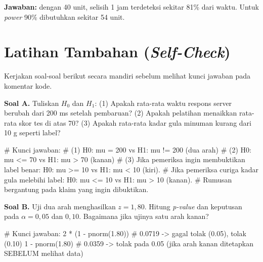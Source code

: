 \documentclass[
  indonesian,
  letterpaper,
]{book}
\newenvironment{Shaded}{\begin{snugshade}}{\end{snugshade}}
\newcommand{\CommentTok}[1]{\textcolor[rgb]{0.37,0.37,0.37}{#1}}
\newcommand{\DecValTok}[1]{\textcolor[rgb]{0.68,0.00,0.00}{#1}}
\newcommand{\FloatTok}[1]{\textcolor[rgb]{0.68,0.00,0.00}{#1}}
\newcommand{\FunctionTok}[1]{\textcolor[rgb]{0.28,0.35,0.67}{#1}}
\newcommand{\NormalTok}[1]{\textcolor[rgb]{0.00,0.23,0.31}{#1}}
\newcommand{\SpecialCharTok}[1]{\textcolor[rgb]{0.37,0.37,0.37}{#1}}
\begin{document}
\textbf{Jawaban:} dengan 40 unit, selisih 1 jam terdeteksi sekitar 81\%
dari waktu. Untuk \emph{power} 90\% dibutuhkan sekitar 54 unit.

\section{\texorpdfstring{Latihan Tambahan
(\emph{Self-Check})}{Latihan Tambahan (Self-Check)}}\label{latihan-tambahan-self-check}

Kerjakan soal-soal berikut secara mandiri sebelum melihat kunci jawaban
pada komentar kode.

\textbf{Soal A.} Tuliskan \(H_0\) dan \(H_1\): (1) Apakah rata-rata
waktu respons server berubah dari 200 ms setelah pembaruan? (2) Apakah
pelatihan menaikkan rata-rata skor tes di atas 70? (3) Apakah rata-rata
kadar gula minuman kurang dari 10 g seperti label?

\begin{Shaded}
\begin{Highlighting}[]
\CommentTok{\# Kunci jawaban:}
\CommentTok{\# (1) H0: mu = 200 vs H1: mu != 200 (dua arah)}
\CommentTok{\# (2) H0: mu \textless{}= 70 vs H1: mu \textgreater{} 70 (kanan)}
\CommentTok{\# (3) Jika pemeriksa ingin membuktikan label benar: H0: mu \textgreater{}= 10 vs H1: mu \textless{} 10 (kiri).}
\CommentTok{\#     Jika pemeriksa curiga kadar gula melebihi label: H0: mu \textless{}= 10 vs H1: mu \textgreater{} 10 (kanan).}
\CommentTok{\#     Rumusan bergantung pada klaim yang ingin dibuktikan.}
\end{Highlighting}
\end{Shaded}

\textbf{Soal B.} Uji dua arah menghasilkan \(z = 1{,}80\). Hitung
\emph{p-value} dan keputusan pada \(\alpha = 0{,}05\) dan \(0{,}10\).
Bagaimana jika ujinya satu arah kanan?

\begin{Shaded}
\begin{Highlighting}[]
\CommentTok{\# Kunci jawaban:}
\DecValTok{2} \SpecialCharTok{*}\NormalTok{ (}\DecValTok{1} \SpecialCharTok{{-}} \FunctionTok{pnorm}\NormalTok{(}\FloatTok{1.80}\NormalTok{))   }\CommentTok{\# 0.0719 {-}\textgreater{} gagal tolak (0.05), tolak (0.10)}
\DecValTok{1} \SpecialCharTok{{-}} \FunctionTok{pnorm}\NormalTok{(}\FloatTok{1.80}\NormalTok{)         }\CommentTok{\# 0.0359 {-}\textgreater{} tolak pada 0.05 (jika arah kanan ditetapkan SEBELUM melihat data)}
\end{Highlighting}
\end{Shaded}
\end{document}

